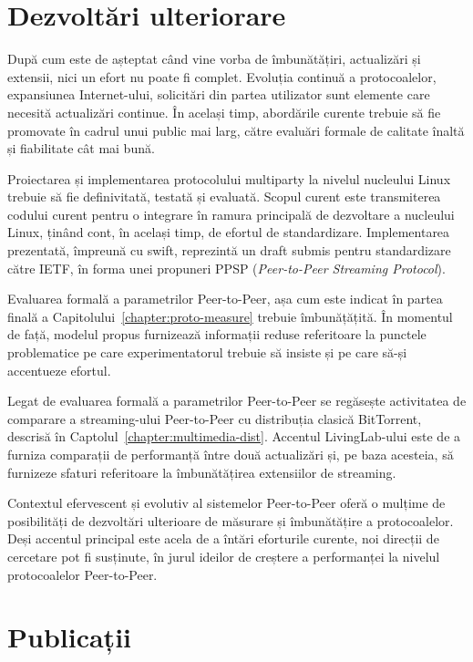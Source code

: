\section{Dezvoltări ulteriorare}
\label{sec:conclusion:future}

După cum este de așteptat când vine vorba de îmbunătățiri, actualizări și
extensii, nici un efort nu poate fi complet. Evoluția continuă a
protocoalelor, expansiunea Internet-ului, solicitări din partea utilizator
sunt elemente care necesită actualizări continue. În același timp, abordările
curente trebuie să fie promovate în cadrul unui public mai larg, către
evaluări formale de calitate înaltă și fiabilitate cât mai bună.

Proiectarea și implementarea protocolului multiparty la nivelul nucleului
Linux trebuie să fie definivitată, testată și evaluată. Scopul curent este
transmiterea codului curent pentru o integrare în ramura principală de
dezvoltare a nucleului Linux, ținând cont, în același timp, de efortul de
standardizare. Implementarea prezentată, împreună cu swift, reprezintă un
draft submis pentru standardizare către IETF, în forma unei propuneri PPSP
(\textit{Peer-to-Peer Streaming Protocol}).

Evaluarea formală a parametrilor Peer-to-Peer, așa cum este indicat în partea
finală a Capitolului~\ref{chapter:proto-measure} trebuie îmbunățățită. În
momentul de față, modelul propus furnizează informații reduse referitoare la
punctele problematice pe care experimentatorul trebuie să insiste și pe care
să-și accentueze efortul.

Legat de evaluarea formală a parametrilor Peer-to-Peer se regăsește
activitatea de comparare a streaming-ului Peer-to-Peer cu distribuția clasică
BitTorrent, descrisă în Captolul~\ref{chapter:multimedia-dist}. Accentul
LivingLab-ului este de a furniza comparații de performanță între două
actualizări și, pe baza acesteia, să furnizeze sfaturi referitoare la
îmbunătățirea extensiilor de streaming.

Contextul efervescent și evolutiv al sistemelor Peer-to-Peer oferă o mulțime
de posibilități de dezvoltări ulterioare de măsurare și îmbunătățire a
protocoalelor. Deși accentul principal este acela de a întări eforturile
curente, noi direcții de cercetare pot fi susținute, în jurul ideilor de
creștere a performanței la nivelul protocoalelor Peer-to-Peer.

\section{Publicații}
\label{sec:conclusion:publications}

